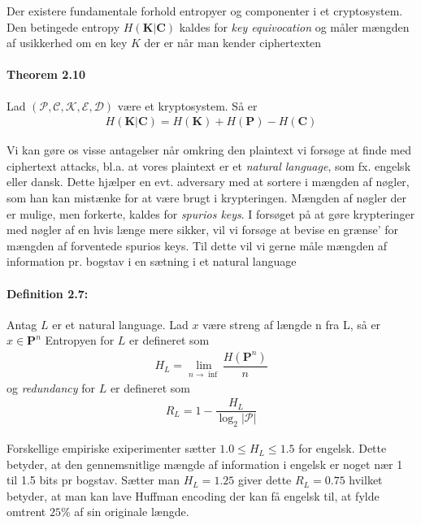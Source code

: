 \documentclass[paper=a4, fontsize=11pt]{scrartcl} %
\numberwithin{equation}{section} %
\numberwithin{figure}{section} %
\numberwithin{table}{section} %
\begin{document}
	Der existere fundamentale forhold entropyer og componenter i et cryptosystem. Den betingede entropy $H(\mathbf{K}|\mathbf{C})$ kaldes for \textit{key equivocation} og måler mængden af usikkerhed om en key $K$ der er når man kender ciphertexten
	
	\paragraph{\textbf{Theorem 2.10}} Lad $(\mathcal{P}, \mathcal{C}, \mathcal{K}, \mathcal{E}, \mathcal{D})$ være et kryptosystem. Så er 
	\begin{align*}
	H(\mathbf{K}|\mathbf{C})=H(\mathbf{K}) + H(\mathbf{P})-H(\mathbf{C})
	\end{align*}
	
	Vi kan gøre os visse antagelser når omkring den plaintext vi forsøge at finde med ciphertext attacks, bl.a. at vores plaintext er et \textit{natural language}, som fx. engelsk eller dansk. Dette hjælper en evt. adversary med at sortere i mængden af nøgler, som han kan mistænke for at være brugt i krypteringen. Mængden af nøgler der er mulige, men forkerte, kaldes for \textit{spurios keys}. I forsøget på at gøre krypteringer med nøgler af en hvis længe mere sikker, vil vi forsøge at bevise en grænse' for mængden af forventede spurios keys. Til dette vil vi gerne måle mængden af information pr. bogstav i en sætning i et natural language\\
	
	\paragraph{\textbf{Definition 2.7:}} Antag $L$ er et natural language. Lad $x$ være streng af længde n fra L, så er $x\in\mathbf{P}^n$ Entropyen for $L$ er defineret som
	\begin{align*}
	H_L=\lim_{n\rightarrow\inf}\dfrac{H(\mathbf{P}^n)}{n}
	\end{align*}
	og \textit{redundancy} for $L$ er defineret som 
	\begin{align*}
	R_L=1-\dfrac{H_L}{\log_2 |\mathcal{P}|}
	\end{align*}
	  
	Forskellige empiriske exiperimenter sætter $1.0\leq H_L \leq 1.5$ for engelsk. Dette betyder, at den gennemsnitlige mængde af information i engelsk er noget nær 1 til 1.5 bits pr bogstav. Sætter man $H_L=1.25$ giver dette $R_L=0.75$ hvilket betyder, at man kan lave Huffman encoding der kan få engelsk til, at fylde omtrent $25\%$ af sin originale længde. \\
	
\end{document}
